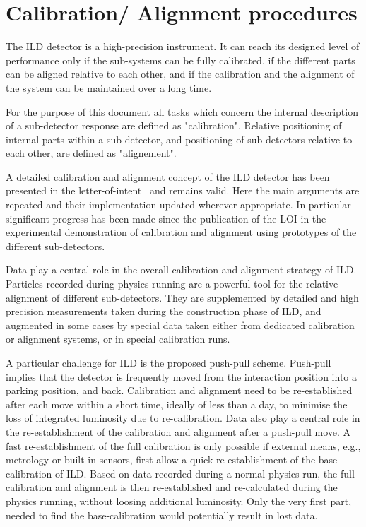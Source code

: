 \section{Calibration/ Alignment procedures}

The ILD detector is a high-precision instrument. It can reach its designed level of performance only if the sub-systems can be fully calibrated, if the different parts can be aligned relative to each other, and if the calibration and the alignment of the system can be maintained over a long time. 

For the purpose of this document all tasks which concern the internal description of a sub-detector response are defined as "calibration". Relative positioning of internal parts within a sub-detector, and positioning of sub-detectors relative to each other, are defined as "alignement". 

A detailed calibration and alignment concept of the ILD detector has been presented in the letter-of-intent~\cite{ild:bib:ILDloi} and remains valid. Here the main arguments are repeated and their implementation updated wherever appropriate. In particular significant progress has been made since the publication of the LOI in the experimental demonstration of calibration and alignment using prototypes of the different sub-detectors. 

Data play a central role in the overall calibration and alignment strategy of ILD. Particles recorded during physics running are a powerful tool for the relative alignment of different sub-detectors. They are supplemented by detailed and high precision measurements taken during the construction phase of ILD, and  augmented in some cases by special data taken either from dedicated calibration or alignment systems, or in special calibration runs. 

A particular challenge for ILD is the proposed push-pull scheme. Push-pull implies that the detector is frequently moved from the interaction position into a parking position, and back. Calibration and alignment need to be re-established after each move within a short time, ideally of less than a day, to minimise the loss of integrated luminosity due to re-calibration. 
Data also play a central role in the re-establishment of the calibration and alignment after a push-pull move. A fast re-establishment of the full calibration is only possible if external means, e.g., metrology or built in sensors, first allow a quick re-establishment of the base calibration of ILD. Based on data recorded during a normal physics run, the full calibration and alignment is then re-established and re-calculated during the physics running, without loosing additional luminosity. Only the very first part, needed to find the base-calibration would potentially result in lost data. 

